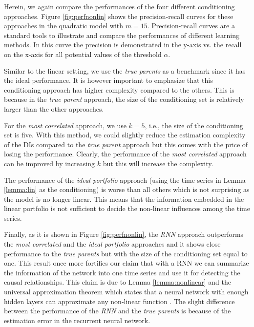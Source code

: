 Herein, we again compare the performances of the four different conditioning approaches. 
Figure \ref{fig:perfnonlin} shows the precision-recall curves for these approaches in the quadratic model with $m=15$. 
Precision-recall curves are a standard tools to illustrate and compare the performances of different learning methods. 
In this curve the precision is demonstrated in the y-axis vs. the recall on the x-axis for all potential values of the threshold $\alpha$. 

Similar to the linear setting, we use the \textit{true parents} as a benchmark since it has the ideal performance. 
It is however important to emphasize that this conditioning approach has higher complexity compared to the others. 
This is because in the \textit{true parent} approach, the size of the conditioning set is relatively larger than the other approaches. 

For the \textit{most correlated} approach, we use $k=5$, i.e., the size of the conditioning set is five.
With this method, we could slightly reduce the estimation complexity of the DIs compared to the  \textit{true parent} approach but this comes with the price of losing the performance.
Clearly, the performance of the \textit{most correlated} approach can be improved by increasing $k$ but this will increase the complexity.

The performance of the \textit{ideal portfolio} approach (using the time series in Lemma \ref{lemma:lin} as the conditioning) is worse than all others which is not surprising as the model is no longer linear. 
This means that the information embedded in the linear portfolio is not sufficient to decide the non-linear influences among the time series. 

Finally, as it is shown in Figure \ref{fig:perfnonlin}, the \textit{RNN} approach outperforms the \textit{most correlated} and the \textit{ideal portfolio} approaches and it shows close performance to the \textit{true parents} but with the size of the conditioning set equal to one. 
This result once more fortifies our claim that with a RNN we can summarize the information of the network into one time series and use it for detecting the causal relationships. 
This claim is due to Lemma \ref{lemma:nonlinear} and the universal approximation theorem which states that a neural network with enough hidden layers can approximate any non-linear function  \citet{HORNIK1989359}.
The slight difference between the performance of the \textit{RNN} and the \textit{true parents} is because of the estimation error in the recurrent neural network. 


